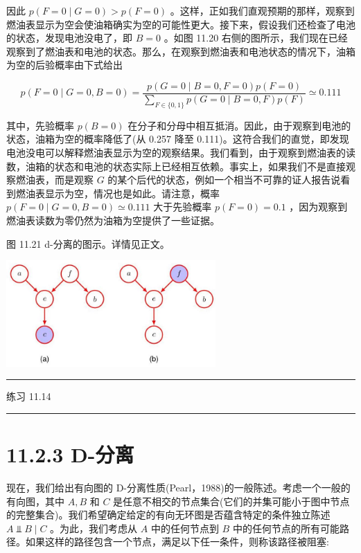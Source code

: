 \documentclass[10pt]{article}
\newcommand{\HRule}{\begin{center}\rule{0.9\linewidth}{0.2mm}\end{center}}
\begin{document}
因此 \(p\left( {F = 0 \mid  G = 0}\right)  > p\left( {F = 0}\right)\) 。这样，正如我们直观预期的那样，观察到燃油表显示为空会使油箱确实为空的可能性更大。接下来，假设我们还检查了电池的状态，发现电池没电了，即 \(B = 0\) 。如图 11.20 右侧的图所示，我们现在已经观察到了燃油表和电池的状态。那么，在观察到燃油表和电池状态的情况下，油箱为空的后验概率由下式给出

\[
p\left( {F = 0 \mid  G = 0,B = 0}\right)  = \frac{p\left( {G = 0 \mid  B = 0,F = 0}\right) p\left( {F = 0}\right) }{\mathop{\sum }\limits_{{F \in  \{ 0,1\} }}p\left( {G = 0 \mid  B = 0,F}\right) p\left( F\right) } \simeq  {0.111} \tag{11.35}
\]

其中，先验概率 \(p\left( {B = 0}\right)\) 在分子和分母中相互抵消。因此，由于观察到电池的状态，油箱为空的概率降低了(从 0.257 降至 0.111)。这符合我们的直觉，即发现电池没电可以解释燃油表显示为空的观察结果。我们看到，由于观察到燃油表的读数，油箱的状态和电池的状态实际上已经相互依赖。事实上，如果我们不是直接观察燃油表，而是观察 \(G\) 的某个后代的状态，例如一个相当不可靠的证人报告说看到燃油表显示为空，情况也是如此。请注意，概率 \(p\left( {F = 0 \mid  G = 0,B = 0}\right)  \simeq  {0.111}\) 大于先验概率 \(p\left( {F = 0}\right)  = {0.1}\) ，因为观察到燃油表读数为零仍然为油箱为空提供了一些证据。

图 11.21 d-分离的图示。详情见正文。

\begin{center}
\includegraphics[max width=0.6\textwidth]{images/0194e279-9b28-703a-88f4-c3ac21e2010d_362_789_341_764_388_0.jpg}
\end{center}
\hspace*{3em} 

\HRule

练习 11.14

\HRule

\section*{11.2.3 D-分离}

现在，我们给出有向图的 D-分离性质(Pearl，1988)的一般陈述。考虑一个一般的有向图，其中 \(A,B\) 和 \(C\) 是任意不相交的节点集合(它们的并集可能小于图中节点的完整集合)。我们希望确定给定的有向无环图是否蕴含特定的条件独立陈述 \(A ⫫ B \mid  C\) 。为此，我们考虑从 \(A\) 中的任何节点到 \(B\) 中的任何节点的所有可能路径。如果这样的路径包含一个节点，满足以下任一条件，则称该路径被阻塞:
\end{document}
